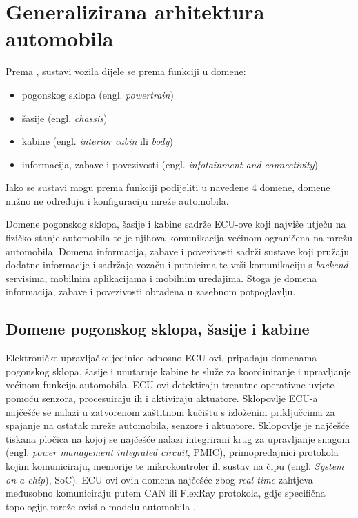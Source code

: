 \documentclass[times, utf8, diplomski, numeric]{fer}
\begin{document}
\section{Generalizirana arhitektura automobila}
Prema \cite{nasser2023automotive, koscher2010, knight2020hacking, huq2020driving, aliwa2021cyberattacks}, sustavi vozila dijele se prema funkciji u domene:

\begin{itemize}
    \item pogonskog sklopa (engl. \textit{powertrain})
    \item šasije (engl. \textit{chassis})
    \item kabine (engl. \textit{interior cabin} ili \textit{body})
    \bigskip
    \item informacija, zabave i povezivosti (engl. \textit{infotainment and connectivity})
\end{itemize}

Iako se sustavi mogu prema funkciji podijeliti u navedene 4 domene, domene nužno ne određuju i konfiguraciju mreže automobila.

Domene pogonskog sklopa, šasije i kabine sadrže ECU-ove koji najviše utječu na fizičko stanje automobila te je njihova komunikacija većinom ograničena na mrežu automobila. Domena informacija, zabave i povezivosti sadrži sustave koji pružaju dodatne informacije i sadržaje vozaču i putnicima te vrši komunikaciju s \textit{backend} servisima, mobilnim aplikacijama i mobilnim uređajima. Stoga je domena informacija, zabave i povezivosti obrađena u zasebnom potpoglavlju.   
\subsection{Domene pogonskog sklopa, šasije i kabine}
Elektroničke upravljačke jedinice odnosno ECU-ovi, pripadaju domenama pogonskog sklopa, šasije i unutarnje kabine te služe za koordiniranje i upravljanje većinom funkcija automobila. ECU-ovi detektiraju trenutne operativne uvjete pomoću senzora, procesuiraju ih i aktiviraju aktuatore\cite{bosch2022handbook}. Sklopovlje ECU-a najčešće se nalazi u zatvorenom zaštitnom kućištu s izloženim priključcima za spajanje na ostatak mreže automobila, senzore i aktuatore. Sklopovlje je najčešće tiskana pločica na kojoj se najčešće nalazi integrirani krug za upravljanje snagom (engl. \textit{power management integrated circuit}, PMIC), primopredajnici protokola kojim komuniciraju, memorije te mikrokontroler ili sustav na čipu (engl. \textit{System on a chip}), SoC)\cite{nasser2023automotive}. ECU-ovi ovih domena najčešće zbog \textit{real time} zahtjeva međusobno komuniciraju putem CAN ili FlexRay protokola, gdje specifična topologija mreže ovisi o modelu automobila \cite{bosch2022handbook}.
\end{document}
